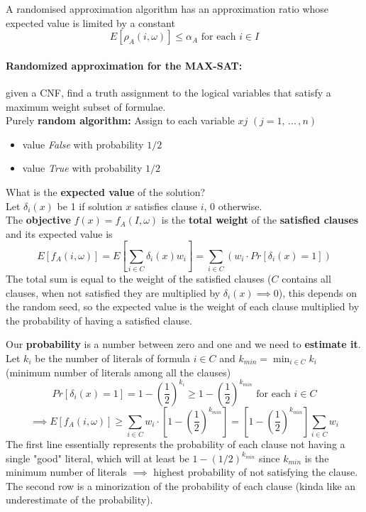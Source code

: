 A randomised approximation algorithm has an approximation ratio whose expected value is limited by a constant
$$ E \left[\rho_A (i, \omega)\right] \leq \alpha_A \text{ for each } i \in I $$

\paragraph{Randomized approximation for the MAX-SAT:} given a CNF, find a truth assignment to the logical variables that satisfy a maximum weight subset of formulae.\\

Purely \textbf{random algorithm:} Assign to each variable $xj$ $(j = 1, \, ... \, , n)$
\begin{itemize}
	\item value \textit{False} with probability $1/2$
	\item value \textit{True} with probability $1/2$
\end{itemize}
What is the \textbf{expected value} of the solution? \\

Let $\delta_i (x)$ be 1 if solution $x$ satisfies clause $i$, 0 otherwise.\\

The \textbf{objective} $f (x) = f_A (I , \omega)$ is the \textbf{total weight} of the \textbf{satisfied clauses} and its expected value is
$$ E \left[f_A (i, \omega)\right] = E \left[\sum_{i \in C} \delta_i (x) w_i \right] = \sum_{i \in C} \left(w_i \cdot Pr \left[\delta_i (x) = 1\right]\right)$$
The total sum is equal to the weight of the satisfied clauses ($C$ contains all clauses, when not satisfied they are multiplied by $\delta_i (x) \implies 0$), this depends on the random seed, so the expected value is the weight of each clause multiplied by the probability of having a satisfied clause.\\

\newpage

Our \textbf{probability} is a number between zero and one and we need to \textbf{estimate it}.\\
Let $k_i$ be the number of literals of formula $i \in C$ and $k_{min} = \min_{i \in C} k_i$ (minimum number of literals among all the clauses)
$$ Pr \left[\delta_i (x) = 1\right] = 1 - \left(\frac{1}{2}\right)^{k_i} \geq 1 - \left(\frac{1}{2}\right)^{k_{min}} \text{ for each } i \in C $$
$$ \implies E \left[f_A (i, \omega)\right] \geq \sum_{i \in C} w_i \cdot \left[1 - \left(\frac{1}{2}\right)^{k_{min}}\right] = \left[1 - \left(\frac{1}{2}\right)^{k_{min}}\right] \sum_{i \in C} w_i $$
The first line essentially represents the probability of each clause not having a single "good" literal, which will at least be $1 - (1/2)^{k_{min}}$ since $k_{min}$ is the minimum number of literals $\implies$ highest probability of not satisfying the clause.\\
The second row is a minorization of the probability of each clause (kinda like an underestimate of the probability).\\

